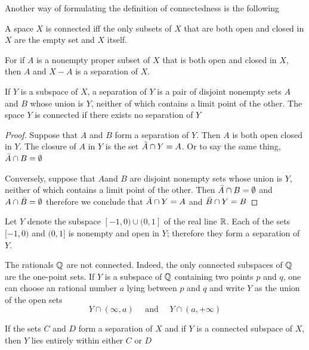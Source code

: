 \documentclass[11pt]{article}
\begin{document}
Another way of formulating the definition of connectedness is the following
\begin{quoting}
A space \(X\) is connected iff the only subsets of \(X\) that are both open and closed in \(X\)
are the empty set and \(X\) itself.
\end{quoting}

For if \(A\) is a nonempty proper subset of \(X\) that is both open and closed in \(X\),
then \(A\) and \(X-A\) is a separation of \(X\).

\begin{lemma}[]
If \(Y\) is a subspace of \(X\), a separation of \(Y\) is a pair of disjoint nonempty sets \(A\)
and \(B\) whose union is \(Y\), neither of which contains a limit point of the other. The
space \(Y\) is connected if there exists no separation of \(Y\)
\end{lemma}

\begin{proof}
Suppose that \(A\) and \(B\) form a separation of \(Y\). Then \(A\) is both open closed in \(Y\).
The closure of \(A\) in \(Y\) is the set \(\bar{A}\cap Y=A\). Or to say the same thing, \(\bar{A}\cap B=\emptyset\)

Conversely, suppose that \(A\)and \(B\) are disjoint nonempty sets whose union is \(Y\), neither
of which contains a limit point of the other. Then \(\bar{A}\cap B=\emptyset\) and \(A\cap\bar{B}=\emptyset\)
therefore we conclude that \(\bar{A}\cap Y=A\) and \(\bar{B}\cap Y=B\)
\end{proof}

\begin{examplle}[]
Let \(Y\) denote the subspace \([-1,0)\cup(0,1]\) of the real line \(\mathbb{R}\). Each of the
sets \([-1,0)\) and \((0,1]\) is nonempty and open in \(Y\); therefore they form a separation of \(Y\).
\end{examplle}

\begin{examplle}[]
The rationals \(\mathbb{Q}\) are not connected. Indeed, the only connected subspaces of \(\mathbb{Q}\) are the
one-point sets. If \(Y\) is a subspace of \(\mathbb{Q}\) containing two points \(p\) and \(q\), one can
choose an rational number \(a\) lying between \(p\) and \(q\) and write \(Y\) as the union of
the open sets
\begin{equation*}
Y\cap(\infty,a)\quad\text{ and }\quad Y\cap(a,+\infty)
\end{equation*}
\end{examplle}

\begin{lemma}[]
\label{lemma23.2}
If the sets \(C\) and \(D\) form a separation of \(X\) and if \(Y\) is a connected subspace
of \(X\), then \(Y\) lies entirely within either \(C\) or \(D\)
\end{lemma}
\end{document}
